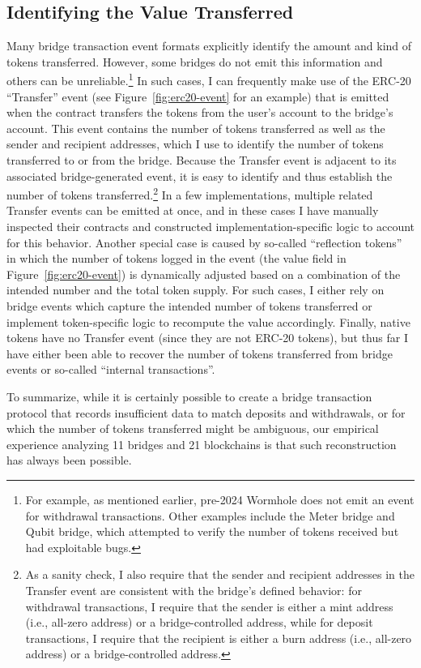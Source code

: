 \subsection{Identifying the Value Transferred}
Many bridge transaction event formats explicitly identify the amount
and kind of tokens transferred. However, some bridges do not emit this
information and others can be unreliable.\footnote{For example, as
  mentioned earlier, pre-2024 Wormhole does not emit an event for
  withdrawal transactions. Other examples include the Meter bridge and
  Qubit bridge, which attempted to verify the number of tokens
  received but had exploitable bugs.}  In such cases, I can
frequently make use of the ERC-20 ``Transfer'' event (see
Figure~\ref{fig:erc20-event} for an example) that is emitted when the
contract transfers the tokens from the user's account to the bridge's
account.  This event contains the number of tokens transferred as well
as the sender and recipient addresses, which I use to identify the
number of tokens transferred to or from the bridge.  Because the
Transfer event is adjacent to its associated bridge-generated event,
it is easy to identify and thus establish the number of tokens
transferred.\footnote{As a sanity check, I also require that the
  sender and recipient addresses in the Transfer event are consistent
  with the bridge's defined behavior: for withdrawal transactions, I
  require that the sender is either a mint address (i.e., all-zero
  address) or a bridge-controlled address, while for deposit
  transactions, I require that the recipient is either a burn address
  (i.e., all-zero address) or a bridge-controlled address.}  In a few
implementations, multiple related Transfer events can be emitted at
once, and in these cases I have manually inspected their contracts
and constructed implementation-specific logic to account for this
behavior.  Another special case is caused by so-called ``reflection
tokens'' in which the number of tokens logged in the event (the value
field in Figure~\ref{fig:erc20-event}) is dynamically adjusted based
on a combination of the intended number and the total token supply.
For such cases, I either rely on bridge events which capture the
intended number of tokens transferred or implement token-specific
logic to recompute the value accordingly.  Finally, native tokens have
no Transfer event (since they are not ERC-20 tokens), but thus far I
have either been able to recover the number of tokens transferred from
bridge events or so-called ``internal transactions''.

To summarize, while it is certainly possible to create a bridge
transaction protocol that records insufficient data to match deposits
and withdrawals, or for which the number of tokens transferred might
be ambiguous, our empirical experience analyzing 11 bridges and 21
blockchains is that such reconstruction has always been possible.


